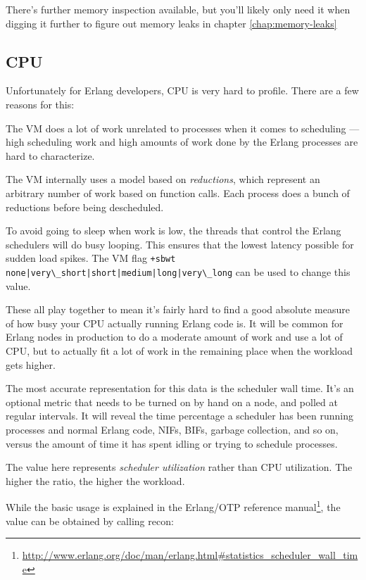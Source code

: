 \documentclass[11pt, oneside]{book}   	%
\newcommand{\command}[1]{\Verb`#1`}
\begin{document}
There's further memory inspection available, but you'll likely only need it when digging it further to figure out memory leaks in chapter \ref{chap:memory-leaks}

\subsection{CPU}
\label{subsec:global-cpu}

Unfortunately for Erlang developers, CPU is very hard to profile. There are a few reasons for this:

\begin{itemize*}
	\item The VM does a lot of work unrelated to processes when it comes to scheduling — high scheduling work and high amounts of work done by the Erlang processes are hard to characterize.
	\item The VM internally uses a model based on \emph{reductions}, which represent an arbitrary number of work based on function calls. Each process does a bunch of reductions before being descheduled.
	\item To avoid going to sleep when work is low, the threads that control the Erlang schedulers will do busy looping. This ensures that the lowest latency possible for sudden load spikes. The VM flag \command{+sbwt none|very\_short|short|medium|long|very\_long} can be used to change this value.
\end{itemize*}

These all play together to mean it's fairly hard to find a good absolute measure of how busy your CPU actually running Erlang code is. It will be common for Erlang nodes in production to do a moderate amount of work and use a lot of CPU, but to actually fit a lot of work in the remaining place when the workload gets higher.

The most accurate representation for this data is the scheduler wall time. It's an optional metric that needs to be turned on by hand on a node, and polled at regular intervals. It will reveal the time percentage a scheduler has been running processes and normal Erlang code, NIFs, BIFs, garbage collection, and so on, versus the amount of time it has spent idling or trying to schedule processes.

The value here represents \emph{scheduler utilization} rather than CPU utilization. The higher the ratio, the higher the workload.

While the basic usage is explained in the Erlang/OTP reference manual\footnote{\href{http://www.erlang.org/doc/man/erlang.html\#statistics\_scheduler\_wall\_time}{http://www.erlang.org/doc/man/erlang.html\#statistics\_scheduler\_wall\_time}}, the value can be obtained by calling recon:
\end{document}
